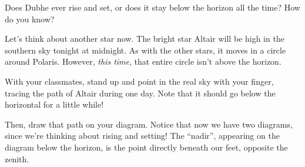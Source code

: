 \documentclass[12pt]{article}
\newcommand{\insp}{\vspace{1in}}
\begin{document}
Does Dubhe ever rise and set, or does it stay below the horizon all the time? How do you know?

\insp

Let's think about another star now. The bright star Altair will be high in the southern sky tonight at midnight. As with the other stars, it moves in a circle around Polaris. However, {\it this time}, that entire circle isn't above the horizon.

With your classmates, stand up and point in the real sky with your finger, tracing the path of Altair during one day. Note that it should go below the horizontal for a little while!

Then, draw that path on your diagram. Notice that now we have two diagrams, since we're thinking about rising and setting! The ``nadir'', appearing on the diagram below the horizon, is the point directly beneath our feet, opposite the zenith.
\end{document}
